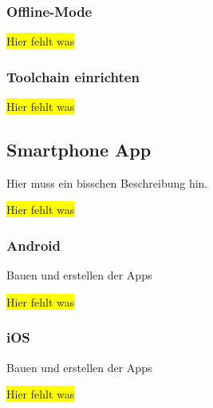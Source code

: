 \subsubsection{Offline-Mode}
\colorbox{yellow}{Hier fehlt was}

\subsubsection{Toolchain einrichten}
\colorbox{yellow}{Hier fehlt was}

\subsection{Smartphone App}
Hier muss ein bisschen Beschreibung hin.

\colorbox{yellow}{Hier fehlt was}

\subsubsection{Android}
Bauen und erstellen der Apps

\colorbox{yellow}{Hier fehlt was}

\subsubsection{iOS}
Bauen und erstellen der Apps

\colorbox{yellow}{Hier fehlt was}
